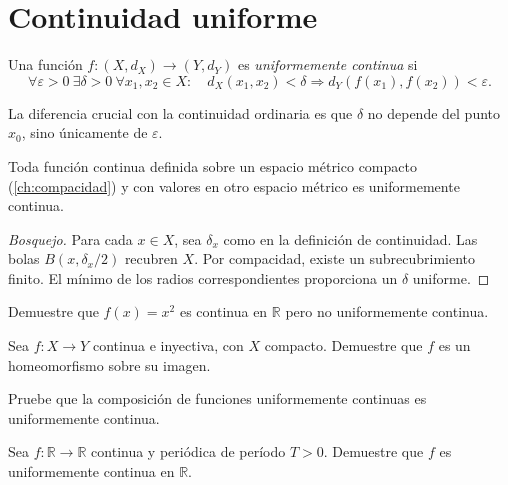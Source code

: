 \section{Continuidad uniforme}

\begin{definition}
\label{def:uniforme}
Una función $f\colon(X,d_X)\to(Y,d_Y)$ es \emph{uniformemente continua} si
\begin{equation}\label{eq:uniforme}
  \forall\varepsilon>0\ \exists\delta>0\ \forall x_1,x_2\in X:\quad d_X(x_1,x_2)<\delta\Rightarrow d_Y(f(x_1),f(x_2))<\varepsilon.
\end{equation}
\end{definition}

La diferencia crucial con la continuidad ordinaria es que $\delta$ no depende del punto $x_0$, sino únicamente de $\varepsilon$.

\begin{theorem}[de Heine]
\label{teo:heine}
Toda función continua definida sobre un espacio métrico compacto (\cref{ch:compacidad}) y con valores en otro espacio métrico es uniformemente continua.
\end{theorem}

\begin{proof}[Bosquejo]
Para cada $x\in X$, sea $\delta_x$ como en la definición de continuidad. Las bolas $B(x,\delta_x/2)$ recubren $X$. Por compacidad, existe un subrecubrimiento finito. El mínimo de los radios correspondientes proporciona un $\delta$ uniforme.
\end{proof}

\begin{exercise}
Demuestre que $f(x)=x^2$ es continua en $\mathbb{R}$ pero no uniformemente continua.
\end{exercise}

\begin{exercise}
Sea $f\colon X\to Y$ continua e inyectiva, con $X$ compacto. Demuestre que $f$ es un homeomorfismo sobre su imagen.
\end{exercise}

\begin{exercise}
Pruebe que la composición de funciones uniformemente continuas es uniformemente continua.
\end{exercise}

\begin{problem}
Sea $f\colon\mathbb{R}\to\mathbb{R}$ continua y periódica de período $T>0$. Demuestre que $f$ es uniformemente continua en $\mathbb{R}$.
\end{problem}
